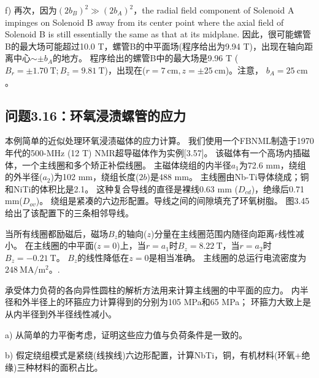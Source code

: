 f) 再次，因为$(2b_B)^2\gg (2b_A)^2$，the radial field component of Solenoid A impinges on Solenoid B away from its center point where the axial field of Solenoid B is still essentially the same as that at its midplane. 因此，很可能螺管B的最大场可能超过10.0 T，螺管B的中平面场(程序给出为9.94 T)，出现在轴向距离中心$\sim \pm b_A$的地方。
程序给出的螺管B中的最大场是9.96 T ($B_r = \pm 1.70\ \mathrm{T};B_z =9.81\ \mathrm{T}$)，出现在($r=7\ \mathrm{cm}, z=\pm 25\ \mathrm{cm}$)。注意，
$b_A=25\ \mathrm{cm}$。


\subsection{问题3.16：环氧浸渍螺管的应力}
本例简单的近似处理环氧浸渍磁体的应力计算。
我们使用一个FBNML制造于1970年代的500-MHz (12 T) NMR超导磁体作为实例[3.57]。
该磁体有一个高场内插磁体，一个主线圈和多个矫正补偿线圈。
主磁体绕组的内半径$a_1$为72.6 mm，绕组的外半径($a_2$)为102 mm，绕组长度($2b$)是488 mm。
主线圈由Nb-Ti导体绕成；铜和NiTi的体积比是2.1。
这种复合导线的直径是裸线0.63 mm ($D_{cd}$)，绝缘后0.71 mm($D_{ov}$)。
绕组是紧凑的六边形配置。导线之间的间隙填充了环氧树脂。
图3.45给出了该配置下的三条相邻导线。

当所有线圈都励磁后，磁场$B_z$的轴向($z$)分量在主线圈范围内随径向距离$r$线性减小。
在主线圈的中平面($z = 0$)上，当$r = a_1$时$B_z=8.22\ \mathrm{T} $，当$r = a_2$时$B_z=-0.21\ \mathrm{T} $。
$B_z$的线性降低在$z=0$是相当准确。
主线圈的总运行电流密度为$248\ \mathrm{MA/m^2} $。.

承受体力负荷的各向异性圆柱的解析方法用来计算主线圈的中平面的应力。
内半径和外半径上的环箍应力计算得到的分别为105 MPa和65 MPa；
环箍力大致上是从内半径到外半径线性减小。

a) 从简单的力平衡考虑，证明这些应力值与负荷条件是一致的。

b) 假定绕组模式是紧绕(线挨线)六边形配置，计算NbTi，铜，有机材料(环氧+绝缘)三种材料的面积占比。

